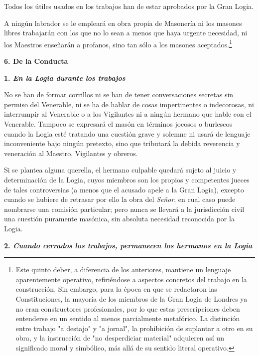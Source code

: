 \documentclass[a4paper,12pt,twoside]{book}
\begin{document}
\noindent Todos los útiles usados en los trabajos han de estar aprobados por la Gran Logia.

\noindent A ningún labrador se le empleará en obra propia de Masonería ni los masones libres trabajarán con los que no lo sean a menos que haya urgente necesidad, ni los Maestros enseñarán a profanos, sino tan sólo a los masones aceptados.\footnote{Este quinto deber, a diferencia de los anteriores, mantiene un lenguaje aparentemente operativo, refiriéndose a aspectos concretos del trabajo en la construcción. Sin embargo, para la época en que se redactaron las Constituciones, la mayoría de los miembros de la Gran Logia de Londres ya no eran constructores profesionales, por lo que estas prescripciones deben entenderse en un sentido al menos parcialmente metafórico. La distinción entre trabajo "a destajo" y "a jornal", la prohibición de suplantar a otro en su obra, y la instrucción de "no desperdiciar material" adquieren así un significado moral y simbólico, más allá de su sentido literal operativo.}

\vspace{0.5cm}

\noindent \textbf{6. De la Conducta}

\vspace{0.3cm}
\noindent \textbf{1. \textit{En la Logia durante los trabajos}}

\noindent No se han de formar corrillos ni se han de tener conversaciones secretas sin permiso del Venerable, ni se ha de hablar de cosas impertinentes o indecorosas, ni interrumpir al Venerable o a los Vigilantes ni a ningún hermano que hable con el Venerable. Tampoco se expresará el masón en términos jocosos o burlescos cuando la Logia esté tratando una cuestión grave y solemne ni usará de lenguaje inconveniente bajo ningún pretexto, sino que tributará la debida reverencia y veneración al Maestro, Vigilantes y obreros.

\noindent Si se plantea alguna querella, el hermano culpable quedará sujeto al juicio y determinación de la Logia, cuyos miembros son los propios y competentes jueces de tales controversias (a menos que el acusado apele a la Gran Logia), excepto cuando se hubiere de retrasar por ello la obra del \textit{Señor}, en cual caso puede nombrarse una comisión particular; pero nunca se llevará a la jurisdicción civil una cuestión puramente masónica, sin absoluta necesidad reconocida por la Logia.

\vspace{0.3cm}
\noindent \textbf{2. \textit{Cuando cerrados los trabajos, permanecen los hermanos en la Logia}}
\end{document}
